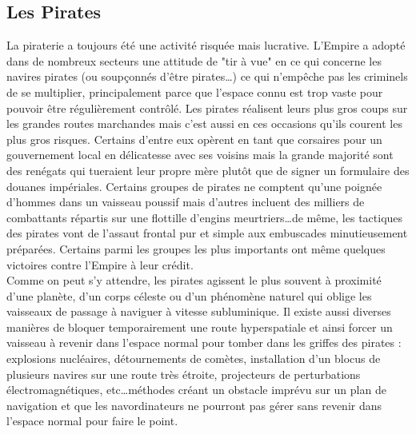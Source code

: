 \documentclass[twoside]{article}
\begin{document}
\subsection{Les Pirates}
La piraterie a toujours été une activité risquée mais lucrative. L'Empire a adopté dans de nombreux secteurs une attitude de "tir à vue" en ce qui concerne les navires pirates (ou soupçonnés d'être pirates\ldots) ce qui n'empêche pas les criminels de se multiplier, principalement parce que l'espace connu est trop vaste pour pouvoir être régulièrement contrôlé. Les pirates réalisent leurs plus gros coups sur les grandes routes marchandes mais c'est aussi en ces occasions qu'ils courent les plus gros risques. Certains d'entre eux opèrent en tant que corsaires pour un gouvernement local en délicatesse avec ses voisins mais la grande majorité sont des renégats qui tueraient leur propre mère plutôt que de signer un formulaire des douanes impériales. Certains groupes de pirates ne comptent qu'une poignée d'hommes dans un vaisseau poussif mais d'autres incluent des milliers de combattants répartis sur une flottille d'engins meurtriers\ldots de même, les tactiques des pirates vont de l'assaut frontal pur et simple aux embuscades minutieusement préparées. Certains parmi les groupes les plus importants ont même quelques victoires contre l'Empire à leur crédit.\\

Comme on peut s'y attendre, les pirates agissent le plus souvent à proximité d'une planète, d'un corps céleste ou d'un phénomène naturel qui oblige les vaisseaux de passage à naviguer à vitesse subluminique. Il existe aussi diverses manières de bloquer temporairement une route hyperspatiale et ainsi forcer un vaisseau à revenir dans l'espace normal pour tomber dans les griffes des pirates : explosions nucléaires, détournements de comètes, installation d'un blocus de plusieurs navires sur une route très étroite, projecteurs de perturbations électromagnétiques, etc\ldots méthodes créant un obstacle imprévu sur un plan de navigation et que les navordinateurs ne pourront pas gérer sans revenir dans l'espace normal pour faire le point.\\
\end{document}
